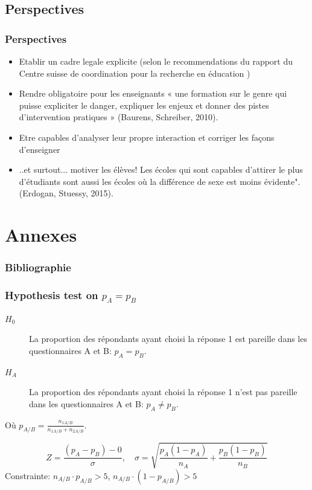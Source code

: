 \documentclass{beamer}
\begin{document}
\subsection{Perspectives}
\begin{frame}
  \frametitle{Perspectives}
  \begin{itemize}
  \item Etablir un cadre legale explicite (selon le recommendations du rapport du Centre suisse de coordination pour la recherche en éducation )
  \item Rendre obligatoire pour les enseignants « une formation sur le genre qui puisse expliciter le danger, expliquer les enjeux  et donner des pistes d’intervention pratiques » (Baurens, Schreiber, 2010). 
  \item Etre capables d’analyser leur propre interaction et corriger les façons d’enseigner 
  \item ..et surtout... motiver les élèves!  Les écoles qui sont capables d’attirer le plus d’étudiants sont aussi les écoles où la différence de sexe est  moins évidente". (Erdogan, Stuessy, 2015). 	  
  \end{itemize}
\end{frame}

\section{Annexes}
\begin{frame}
\frametitle{Bibliographie}
\end{frame}

\begin{frame}
  \frametitle{Hypothesis test on $p_A = p_B $}
  \begin{description}
  \item[$H_0$] La proportion des répondants ayant choisi la réponse 1 est
                pareille dans les questionnaires A et B: $p_A = p_B$. 
  \item[$H_A$] La proportion des répondants ayant choisi la réponse
                1 n’est pas  pareille dans les questionnaires A et B: $p_A \ne p_B$.
  \end{description}
  Où $p_{A/B}  = \frac{n_{1A/B}}{n_{1A/B}  + n_{2A/B}}$.

  \[
  Z = \frac{(p_A-p_B) - 0}{\sigma} ,\quad
  \sigma = \sqrt{\frac{p_A(1-p_A)}{n_A} + \frac{p_B(1-p_B)}{n_B}} 
  \]
  Constrainte: $n_{A/B} \cdot p_{A/B} > 5$, $n_{A/B} \cdot (1-p_{A/B}) > 5$ 
\end{frame}
\end{document}
